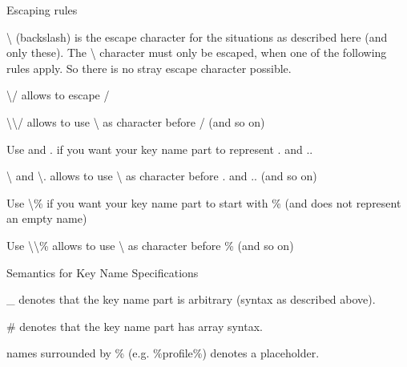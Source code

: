 \begin{DoxyParagraph}{Escaping rules}

\begin{DoxyItemize}
\item \textbackslash{} (backslash) is the escape character for the situations as described here (and only these). The \textbackslash{} character must only be escaped, when one of the following rules apply. So there is no stray escape character possible.
\item \textbackslash{}/ allows to escape /
\item \textbackslash{}\textbackslash{}/ allows to use \textbackslash{} as character before / (and so on)
\item Use  and . if you want your key name part to represent . and ..
\item \textbackslash{} and \textbackslash{}. allows to use \textbackslash{} as character before . and .. (and so on)
\item Use \textbackslash{}\% if you want your key name part to start with \% (and does not represent an empty name)
\item Use \textbackslash{}\textbackslash{}\% allows to use \textbackslash{} as character before \% (and so on)
\end{DoxyItemize}
\end{DoxyParagraph}
\begin{DoxyParagraph}{Semantics for Key Name Specifications}

\begin{DoxyItemize}
\item \-\_\- denotes that the key name part is arbitrary (syntax as described above).
\item \# denotes that the key name part has array syntax.
\item names surrounded by \% (e.\-g. \%profile\%) denotes a placeholder.
\end{DoxyItemize}
\end{DoxyParagraph}
